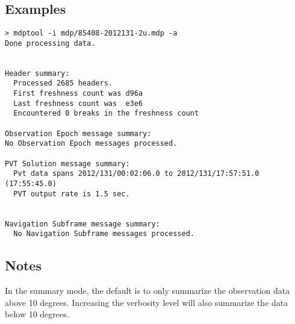\subsection{Examples}
\begin{verbatim}
> mdptool -i mdp/85408-2012131-2u.mdp -a
Done processing data.


Header summary:
  Processed 2685 headers.
  First freshness count was d96a
  Last freshness count was  e3e6
  Encountered 0 breaks in the freshness count

Observation Epoch message summary:
No Observation Epoch messages processed.

PVT Solution message summary:
  Pvt data spans 2012/131/00:02:06.0 to 2012/131/17:57:51.0 (17:55:45.0)
  PVT output rate is 1.5 sec.


Navigation Subframe message summary:
  No Navigation Subframe messages processed.

\end{verbatim}


\subsection{Notes}
In the summary mode, the default is to only summarize the observation data above 10 degrees. Increasing the verbosity level will also summarize the data below 10 degrees.

%
